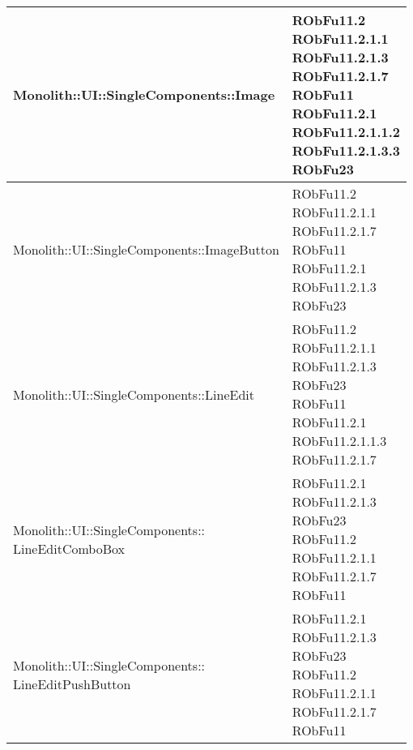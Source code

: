 \begin{center}
\begin{longtable}{|
*{1}{>{\centering\arraybackslash}m{7.5cm}|}
*{1}{>{\centering\arraybackslash}m{2.5cm}|}}
Monolith::UI::SingleComponents::Image & \makecell{RObFu11.2
\\RObFu11.2.1.1
\\RObFu11.2.1.3
\\RObFu11.2.1.7
\\RObFu11
\\RObFu11.2.1
\\RObFu11.2.1.1.2
\\RObFu11.2.1.3.3
\\RObFu23
\\}\\\hline
Monolith::UI::SingleComponents::ImageButton & \makecell{RObFu11.2
\\RObFu11.2.1.1
\\RObFu11.2.1.7
\\RObFu11
\\RObFu11.2.1
\\RObFu11.2.1.3
\\RObFu23
\\}\\\hline
Monolith::UI::SingleComponents::LineEdit & \makecell{RObFu11.2
\\RObFu11.2.1.1
\\RObFu11.2.1.3
\\RObFu23
\\RObFu11
\\RObFu11.2.1
\\RObFu11.2.1.1.3
\\RObFu11.2.1.7
\\}\\\hline
\makecell[l]{Monolith::UI::SingleComponents:: \\ \hfill LineEditComboBox} & \makecell{RObFu11.2.1
\\RObFu11.2.1.3
\\RObFu23
\\RObFu11.2
\\RObFu11.2.1.1
\\RObFu11.2.1.7
\\RObFu11
\\}\\\hline
\makecell[l]{Monolith::UI::SingleComponents:: \\ \hfill LineEditPushButton} & \makecell{RObFu11.2.1
\\RObFu11.2.1.3
\\RObFu23
\\RObFu11.2
\\RObFu11.2.1.1
\\RObFu11.2.1.7
\\RObFu11
}
\end{longtable}
\end{center}
